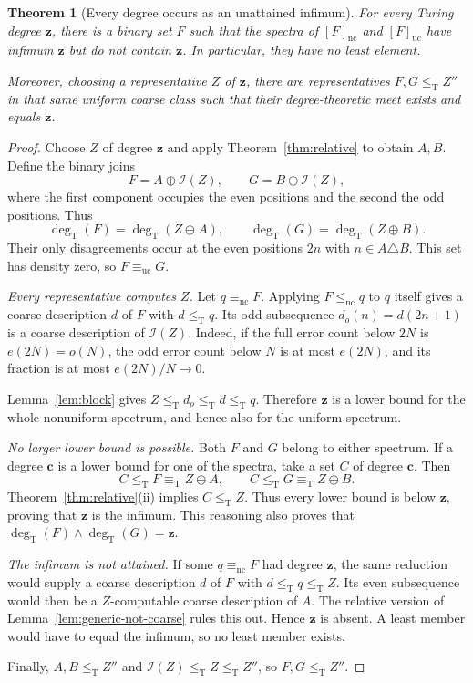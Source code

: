 \documentclass[11pt,a4paper]{article}
\newcommand{\leT}{\leq_{\mathrm T}}
\newcommand{\eqT}{\equiv_{\mathrm T}}
\newcommand{\degT}{\operatorname{deg}_{\mathrm T}}
\newcommand{\nc}{\mathrm{nc}}
\newcommand{\uc}{\mathrm{uc}}
\newcommand{\Icode}{\mathcal I}
\newtheorem{theorem}{Theorem}[section]
\theoremstyle{definition}
\theoremstyle{remark}
\begin{document}
\begin{theorem}[Every degree occurs as an unattained infimum]\label{thm:infimum}
For every Turing degree $\mathbf z$, there is a binary set $F$ such that the spectra of $[F]_{\nc}$ and $[F]_{\uc}$ have infimum $\mathbf z$ but do not contain $\mathbf z$. In particular, they have no least element.

Moreover, choosing a representative $Z$ of $\mathbf z$, there are representatives $F,G\leT Z''$ in that same uniform coarse class such that their degree-theoretic meet exists and equals $\mathbf z$.
\end{theorem}
\begin{proof}
Choose $Z$ of degree $\mathbf z$ and apply Theorem~\ref{thm:relative} to obtain $A,B$. Define the binary joins
\[
F=A\oplus\Icode(Z),\qquad G=B\oplus\Icode(Z),
\]
where the first component occupies the even positions and the second the odd positions. Thus
\[
\degT(F)=\degT(Z\oplus A),\qquad
\degT(G)=\degT(Z\oplus B).
\]
Their only disagreements occur at the even positions $2n$ with $n\in A\triangle B$. This set has density zero, so $F\equiv_{\uc}G$.

\textit{Every representative computes $Z$.}
Let $q\equiv_{\nc}F$. Applying $F\leq_{\nc}q$ to $q$ itself gives a coarse description $d$ of $F$ with $d\leT q$. Its odd subsequence $d_o(n)=d(2n+1)$ is a coarse description of $\Icode(Z)$. Indeed, if the full error count below $2N$ is $e(2N)=o(N)$, the odd error count below $N$ is at most $e(2N)$, and its fraction is at most $e(2N)/N\to0$.

Lemma~\ref{lem:block} gives $Z\leT d_o\leT d\leT q$. Therefore $\mathbf z$ is a lower bound for the whole nonuniform spectrum, and hence also for the uniform spectrum.

\textit{No larger lower bound is possible.}
Both $F$ and $G$ belong to either spectrum. If a degree $\mathbf c$ is a lower bound for one of the spectra, take a set $C$ of degree $\mathbf c$. Then
\[
C\leT F\eqT Z\oplus A,\qquad C\leT G\eqT Z\oplus B.
\]
Theorem~\ref{thm:relative}(ii) implies $C\leT Z$. Thus every lower bound is below $\mathbf z$, proving that $\mathbf z$ is the infimum. This reasoning also proves that $\degT(F)\wedge\degT(G)=\mathbf z$.

\textit{The infimum is not attained.}
If some $q\equiv_{\nc}F$ had degree $\mathbf z$, the same reduction would supply a coarse description $d$ of $F$ with $d\leT q\leT Z$. Its even subsequence would then be a $Z$-computable coarse description of $A$. The relative version of Lemma~\ref{lem:generic-not-coarse} rules this out. Hence $\mathbf z$ is absent. A least member would have to equal the infimum, so no least member exists.

Finally, $A,B\leT Z''$ and $\Icode(Z)\leT Z\leT Z''$, so $F,G\leT Z''$.
\end{proof}
\end{document}
